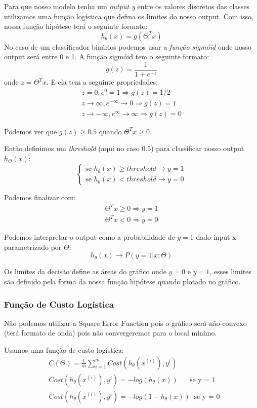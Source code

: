 \documentclass[11pt,a4paper,leqno]{article}
\begin{document}
Para que nosso modelo tenha um \emph{output y} entre os valores discretos das classes utilizamos uma função logística que defina os limites do nosso output.
Com isso, nossa função hipótese terá o seguinte formato:
\[ h_\theta (x) = g(\Theta^T x) \]
No caso de um classificador binários podemos usar a \emph{função sigmóid} onde nosso output será entre 0 e 1.
A função sigmóid tem o seguinte formato:
\[ g(z) = \dfrac{1}{1 + e^{-z}} \]
onde $z = \Theta^T x$. E ela tem a seguinte propriedades:
\begin{eqnarray*}
	z=0, e^{0}=1 \Rightarrow g(z)=1/2 \\
	z \to \infty, e^{-\infty} \to 0 \Rightarrow g(z)=1 \\
	z \to -\infty, e^{\infty}\to \infty \Rightarrow g(z)=0
\end{eqnarray*}

Podemos ver que $g(z) \geq 0.5$ quando $\Theta^Tx \geq 0$.

Então definimos um \emph{threshold} (aqui no caso $0.5$) para classificar nosso output $h_\Theta(x)$:
\[
  \left\{ 
    \begin{array}{ll} 
      \mbox{se } h_\theta(x) \geq threshold \rightarrow y = 1 \\
      \mbox{se } h_\theta(x) < threshold \rightarrow y = 0
    \end{array}
  \right.
\]

Podemos finalizar com:
\begin{align*}
	\Theta^T x \geq 0 \Rightarrow y = 1 \\
	\Theta^T x < 0 \Rightarrow y = 0
\end{align*}

Podemos interpretar o output como a probabilidade de $y = 1$ dado input x parametrizado por $\Theta$:
\[ h_\theta(x) \rightarrow P(y = 1 | x; \Theta) \]

Os limites da decisão define as áreas do gráfico onde $y = 0$ e $y = 1$, esses limites são definido pela forma da nossa função hipótese quando plotado no gráfico.

\subsubsection{Função de Custo Logística}
Não podemos utilizar a Square Error Function pois o gráfico será não-convexo (terá formato de onda) pois não convergeremos para o local mínimo.

Usamos uma função de custo logística:
\begin{align*}
& C(\Theta) = \frac{1}{m} \sum_{i=1}^m Cost(h_\theta(x^{(i)}), y^{i}) \\
& Cost(h_\theta(x^{(i)}), y^{i}) = -log(h_\theta(x)) \ \ \ \ \ \ \text{ se y = 1} \\
& Cost(h_\theta(x^{(i)}), y^{i}) = -log(1 - h_\theta(x)) \ \text{ se y = 0}
\end{align*}
\end{document}

